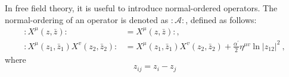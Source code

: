 In free field theory, it is useful to introduce normal-ordered operators. The normal-ordering of an operator is denoted as $:\mathrel{\mathscr{A}}:$, defined as follows:    
\begin{subequations} \label{2.1.21}
	\begin{align}
		: \mathrel{X^{\mu}(z, \bar{z})}:&=X^{\mu}(z, \bar{z}) :, \label{2.1.21a}\\
		: \mathrel{X^{\mu}(z_{1}, \bar{z}_{1}) X^{v}(z_{2}, \bar{z}_{2})}:&=X^{\mu}\left(z_{1}, \bar{z}_{1}\right) X^{v}(z_{2}, \bar{z}_{2})+\frac{\alpha^{\prime}}{2} \eta^{\mu v} \ln \lvert z_{12}\rvert^{2} \:, \label{2.1.21b}
	\end{align}
\end{subequations}
where    
\begin{equation}
	z_{i j}=z_{i}-z_{j}
\end{equation}
